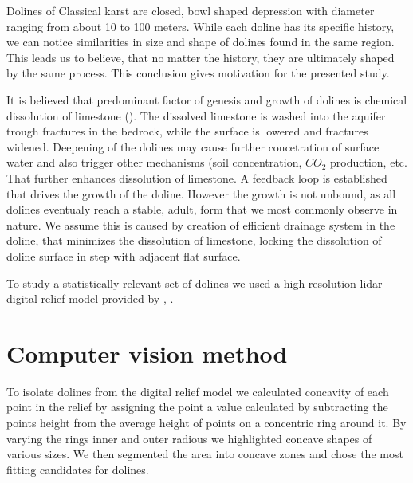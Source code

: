 \documentclass[a0,portrait]{a0poster}
\begin{document}
\begin{multicols}{2}
Dolines of Classical karst are closed, bowl shaped depression with diameter ranging from about 10 to 100 meters. While each doline has its specific history, we can notice similarities in size and shape of dolines found in the same region. This leads us to believe, that no matter the history, they are ultimately shaped by the same process. This conclusion gives motivation for the presented study.

It is believed that predominant factor of genesis and growth of dolines is chemical dissolution of limestone (\cite{ford2007karst}). The dissolved limestone is washed into the aquifer trough fractures in the bedrock, while the surface is lowered and fractures widened. Deepening of the dolines may cause further concetration of surface water and also trigger other mechanisms (soil concentration, $CO_2$ production, etc. That further enhances dissolution of limestone. A feedback loop is established that drives the growth of the doline. However the growth is not unbound, as all dolines eventualy reach a stable, adult, form that we most commonly observe in nature. We assume this is caused by creation of efficient drainage system in the doline, that minimizes the dissolution of limestone, locking the dissolution of doline surface in step with adjacent flat surface.

To study a statistically relevant set of dolines we used a high resolution lidar digital relief model provided by \cite{LAK}, \cite{Kobler20079}.



\section*{Computer vision method}

To isolate dolines from the digital relief model we calculated concavity of each point in the relief by assigning the point a value calculated by subtracting the points height from the average height of points on a concentric ring around it. By varying the rings inner and outer radious we highlighted concave shapes of various sizes.
We then segmented the area into concave zones and chose the most fitting candidates for dolines.


\end{multicols}
\end{document}
